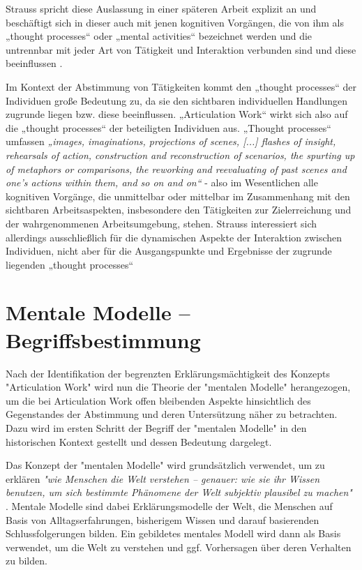Strauss spricht diese Auslassung in einer späteren Arbeit explizit an \citep[][S. 131]{Strauss93} und beschäftigt sich in dieser auch mit jenen kognitiven Vorgängen, die von ihm als „thought processes“ oder „mental activities“ bezeichnet werden und die untrennbar mit jeder Art von Tätigkeit und Interaktion verbunden sind \citep[][S. 146]{Strauss93} und diese beeinflussen \citep[][S. 132]{Strauss93}.  

Im Kontext der Abstimmung von Tätigkeiten kommt den „thought processes“ der Individuen große Bedeutung zu, da sie den sichtbaren individuellen Handlungen zugrunde liegen bzw. diese beeinflussen. „Articulation Work“ wirkt sich also auf die „thought processes“ der beteiligten Individuen aus. „Thought processes“ umfassen \emph{„images, imaginations, projections of scenes, [...] flashes of insight, rehearsals of action, construction and reconstruction of scenarios,  the spurting up of metaphors or comparisons, the reworking and reevaluating of past scenes and one's actions within them, and so on and on“} \citep[][S. 130]{Strauss93} - also im Wesentlichen alle kognitiven Vorgänge, die unmittelbar oder mittelbar im Zusammenhang mit den sichtbaren Arbeitsaspekten, insbesondere den Tätigkeiten zur Zielerreichung und der wahrgenommenen Arbeitsumgebung, stehen. Strauss interessiert sich allerdings ausschließlich für die dynamischen Aspekte der Interaktion zwischen Individuen, nicht aber für die Ausgangspunkte und Ergebnisse der zugrunde liegenden „thought processes“ \citep[][S. 149]{Strauss93}


\section*{Mentale Modelle -- Begriffsbestimmung}

Nach der Identifikation der begrenzten Erklärungsmächtigkeit des Konzepts "Articulation Work" wird nun die Theorie der "mentalen Modelle" herangezogen, um die bei Articulation Work offen bleibenden Aspekte hinsichtlich des Gegenstandes der Abstimmung und deren Untersützung näher zu betrachten. Dazu wird im ersten Schritt der Begriff der "mentalen Modelle" in den historischen Kontext gestellt und dessen Bedeutung dargelegt.

Das Konzept der "mentalen Modelle" wird grundsätzlich verwendet, um zu erklären \emph{"wie Menschen die Welt verstehen -- genauer: wie sie ihr Wissen benutzen, um sich bestimmte Phänomene der Welt subjektiv plausibel zu machen"} \citep[][S. VII]{Seel91}. Mentale Modelle sind dabei Erklärungsmodelle der Welt, die Menschen auf Basis von Alltagserfahrungen, bisherigem Wissen und darauf basierenden Schlussfolgerungen bilden. Ein gebildetes mentales Modell wird dann als Basis verwendet, um die Welt zu verstehen und ggf. Vorhersagen über deren Verhalten zu bilden. \citep[][S. VII]{Seel91}

